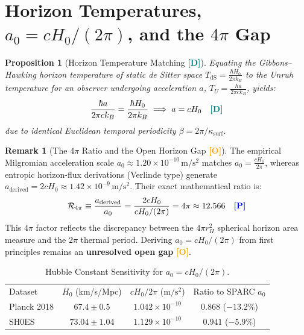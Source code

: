 \documentclass[aps,prd,twocolumn,superscriptaddress,nofootinbib,floatfix]{revtex4-2}
\newcommand{\tagP}{\textcolor{blue}{\textbf{[P]}}}
\newcommand{\tagD}{\textcolor{teal}{\textbf{[D]}}}
\newcommand{\tagO}{\textcolor{orange}{\textbf{[O]}}}
\theoremstyle{plain}
\newtheorem{proposition}[theorem]{Proposition}
\theoremstyle{definition}
\newtheorem{remark}[theorem]{Remark}
\begin{document}
\section{Horizon Temperatures, $a_0 = c H_0 / (2\pi)$, and the $4\pi$ Gap}
\label{sec:acceleration}

\begin{proposition}[Horizon Temperature Matching \tagD]
\label{prop:temp_matching}
Equating the Gibbons--Hawking horizon temperature of static de Sitter space $T_{\mathrm{dS}} = \frac{\hbar H_0}{2\pi k_B}$ to the Unruh temperature for an observer undergoing acceleration $a$, $T_U = \frac{\hbar a}{2\pi c k_B}$, yields:
\begin{equation}
\frac{\hbar a}{2\pi c k_B} = \frac{\hbar H_0}{2\pi k_B} \implies a = c H_0 \quad \tagD
\end{equation}
due to identical Euclidean temporal periodicity $\beta = 2\pi / \kappa_{\mathrm{surf}}$.
\end{proposition}

\begin{remark}[The $4\pi$ Ratio and the Open Horizon Gap \tagO]
\label{rem:4pi_ratio}
The empirical Milgromian acceleration scale $a_0 \approx 1.20 \times 10^{-10}\,\mathrm{m/s^2}$ matches $a_0 = \frac{c H_0}{2\pi}$, whereas entropic horizon-flux derivations (Verlinde type) generate $a_{\mathrm{derived}} = 2 c H_0 \approx 1.42 \times 10^{-9}\,\mathrm{m/s^2}$. Their exact mathematical ratio is:
\begin{equation}
\mathcal{R}_{4\pi} \equiv \frac{a_{\mathrm{derived}}}{a_0} = \frac{2 c H_0}{c H_0 / (2\pi)} = 4\pi \approx 12.566 \quad \tagP
\end{equation}
This $4\pi$ factor reflects the discrepancy between the $4\pi r_H^2$ spherical horizon area measure and the $2\pi$ thermal period. Deriving $a_0 = c H_0 / (2\pi)$ from first principles remains an \textbf{unresolved open gap} \tagO.
\end{remark}

\begin{table}[h!]
\caption{Hubble Constant Sensitivity for $a_0 = c H_0 / (2\pi)$.}
\label{tab:hubble}
\begin{ruledtabular}
\begin{tabular}{lccc}
Dataset & $H_0$ (km/s/Mpc) & $c H_0 / 2\pi$ ($\mathrm{m/s^2}$) & Ratio to SPARC $a_0$ \\
\colrule
Planck 2018 & $67.4 \pm 0.5$ & $1.042 \times 10^{-10}$ & $0.868$ ($-13.2\%$) \\
SH0ES & $73.04 \pm 1.04$ & $1.129 \times 10^{-10}$ & $0.941$ ($-5.9\%$) \\
\end{tabular}
\end{ruledtabular}
\end{table}
\end{document}
